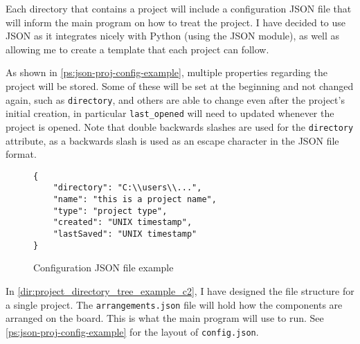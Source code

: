         Each directory that contains a project will include a configuration JSON file that will inform the main program on how to treat the project. 
        I have decided to use JSON as it integrates nicely with Python (using the JSON module), as well as allowing me to create a template that each project can follow. 


        As shown in \autoref{ps:json-proj-config-example}, multiple properties regarding the project will be stored. 
        Some of these will be set at the beginning and not changed again, such as \verb|directory|, and others are able to change even after the project's initial creation, in particular \verb|last_opened| will need to updated whenever the project is opened. 
        Note that double backwards slashes are used for the \verb|directory| attribute, as a backwards slash is used as an escape character in the JSON file format.

        \begin{figure}[!ht]
            \begin{verbatim}
{
    "directory": "C:\\users\\...",
    "name": "this is a project name",
    "type": "project type",
    "created": "UNIX timestamp",
    "lastSaved": "UNIX timestamp"
}
            \end{verbatim}
            \caption{Configuration JSON file example}
            \label{ps:json-proj-config-example}
        \end{figure}


        In \autoref{dir:project_directory_tree_example_c2}, I have designed the file structure for a single project. 
        The \verb|arrangements.json| file will hold how the components are arranged on the board. This is what the main program will use to run. 
        See \autoref{ps:json-proj-config-example} for the layout of \verb|config.json|.


